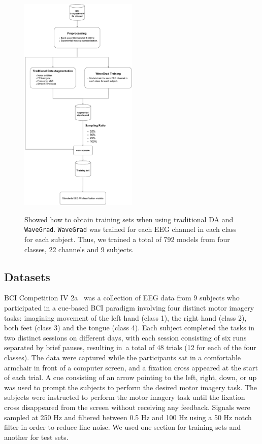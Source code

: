 \documentclass[runningheads]{llncs}
\begin{document}
\begin{figure}[ht]
  \centering
  \caption[System Diagram]{\label{fig:System Diagram} Showed how to obtain training sets when using traditional DA and \texttt{WaveGrad}. \texttt{WaveGrad} was trained for each EEG channel in each class for each subject. Thus, we trained a total of 792 models from four classes, 22 channels and 9 subjects.}
  \includegraphics[width=0.5\textwidth]{fig/dyagram.pdf}
  \label{fig:System}
\end{figure}
\subsection{Datasets}

BCI Competition IV 2a \cite{brunner2008bci} was a collection of EEG data from 9 subjects who participated in a cue-based BCI paradigm involving four distinct motor imagery tasks: imagining movement of the left hand (class 1), the right hand (class 2), both feet (class 3) and the tongue (class 4). Each subject completed the tasks in two distinct sessions on different days, with each session consisting of six runs separated by brief pauses, resulting in a total of 48 trials (12 for each of the four classes). The data were captured while the participants sat in a comfortable armchair in front of a computer screen, and a fixation cross appeared at the start of each trial. A cue consisting of an arrow pointing to the left, right, down, or up was used to prompt the subjects to perform the desired motor imagery task. The subjects were instructed to perform the motor imagery task until the fixation cross disappeared from the screen without receiving any feedback. Signals were sampled at 250 Hz and filtered between 0.5 Hz and 100 Hz using a 50 Hz notch filter in order to reduce line noise. We used one section for training sets and another for test sets.
\end{document}
